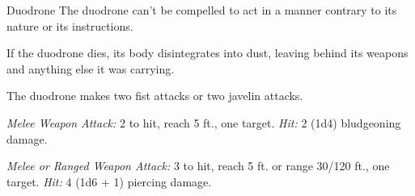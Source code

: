 \documentclass[10pt,a4paper,twoside,bg=print,twocolumn,openany,nodeprecatedcode]{dndarticle}
\begin{document}
\begin{DndMonster}[float=t]{Duodrone}
\DndMonsterBasics[
armor-class = {15 (natural armor)},
hit-points = {\DndDice{2d8 + 2}},
speed = {30 ft.}
]
\DndMonsterAbilityScores[
 str = 11,
 dex = 13,
 con = 12,
 int = 6,
 wis = 10,
 cha = 7
]
\DndMonsterDetails[
senses = {truesight 120 ft., passive perception 10},
languages = {Modron},
challenge = 1/4,
]
The duodrone can't be compelled to act in a manner contrary to its nature or its instructions.

If the duodrone dies, its body disintegrates into dust, leaving behind its weapons and anything else it was carrying.

The duodrone makes two fist attacks or two javelin attacks.

\textsl{Melee Weapon Attack:} 2 to hit, reach 5 ft., one target. \textsl{Hit:} 2 (1d4) bludgeoning damage.

\textsl{Melee or Ranged Weapon Attack:} 3 to hit, reach 5 ft. or range 30/120 ft., one target. \textsl{Hit:} 4 (1d6 + 1) piercing damage.

\end{DndMonster}
\end{document}
